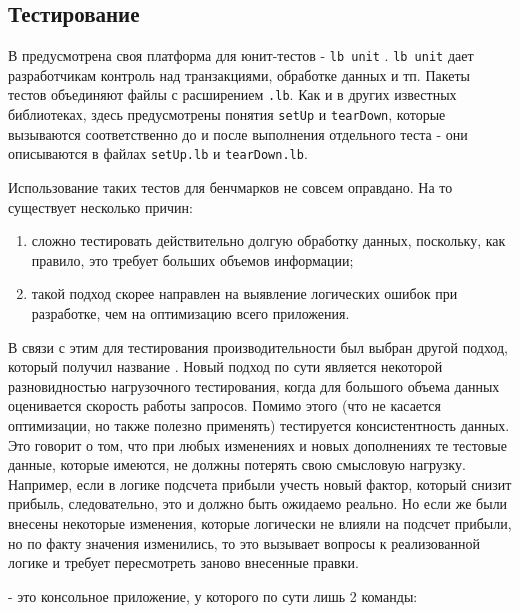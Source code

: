 \subsection{Тестирование}
\label{sec:technology:testing}

В \LB предусмотрена своя платформа для юнит-тестов - \lstinline{lb unit} \cite{lb_testing}. \lstinline{lb unit} дает разработчикам контроль над транзакциями, обработке данных и тп. Пакеты тестов объединяют файлы с расширением \lstinline{.lb}. Как и в других известных библиотеках, здесь предусмотрены понятия \lstinline{setUp} и \lstinline{tearDown}, которые вызываются соответственно до и после выполнения отдельного теста - они описываются в файлах \lstinline{setUp.lb} и \lstinline{tearDown.lb}.

Использование таких тестов для бенчмарков не совсем оправдано. На то существует несколько причин:

\begin{enumerate}
  \item сложно тестировать действительно долгую обработку данных, поскольку, как правило, это требует больших объемов информации;
  \item такой подход скорее направлен на выявление логических ошибок при разработке, чем на оптимизацию всего приложения.
\end{enumerate}

В связи с этим для тестирования производительности был выбран другой подход, который получил название \emph{\lamias}. Новый подход по сути является некоторой разновидностью нагрузочного тестирования, когда для большого объема данных оценивается скорость работы запросов. Помимо этого (что не касается оптимизации, но также полезно применять) тестируется консистентность данных. Это говорит о том, что при любых изменениях и новых дополнениях те тестовые данные, которые имеются, не должны потерять свою смысловую нагрузку. Например, если в логике подсчета прибыли учесть новый фактор, который снизит прибыль, следовательно, это и должно быть ожидаемо реально. Но если же были внесены некоторые изменения, которые логически не влияли на подсчет прибыли, но по факту значения изменились, то это вызывает вопросы к реализованной логике и требует пересмотреть заново внесенные правки.

\lamias - это консольное приложение, у которого по сути лишь 2 команды:

